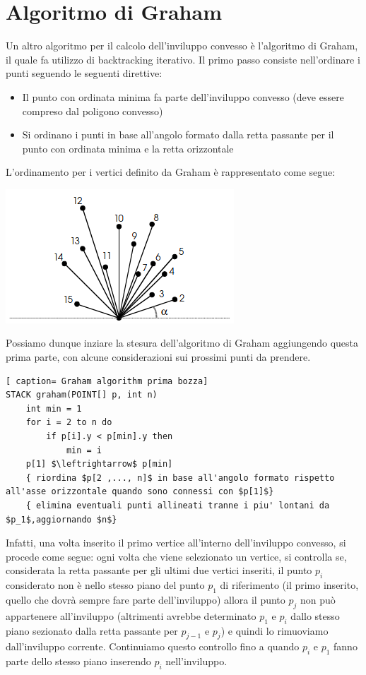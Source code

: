 \documentclass[../cheatSheetAlgoritmi.tex]{subfiles}
\begin{document}
\section{Algoritmo di Graham}
Un altro algoritmo per il calcolo dell'inviluppo convesso è l'algoritmo di Graham, il quale fa utilizzo di backtracking iterativo.
Il primo passo consiste nell'ordinare i punti seguendo le seguenti direttive:
\begin{itemize}
	\item Il punto con ordinata minima fa parte dell'inviluppo convesso (deve essere compreso dal poligono convesso)
	\item Si ordinano i punti in base all'angolo formato dalla retta passante per il punto con ordinata minima e la retta orizzontale
\end{itemize}
L'ordinamento per i vertici definito da Graham è rappresentato come segue:
\begin{center}
	\includegraphics{../img/backtracking_inviluppo_convesso_graham_1}
\end{center}
Possiamo dunque inziare la stesura dell'algoritmo di Graham aggiungendo questa prima parte, con alcune considerazioni sui prossimi punti da prendere. 
 \begin{lstlisting}[ caption= Graham algorithm prima bozza]
STACK graham(POINT[] p, int n)
	int min = 1
	for i = 2 to n do
		if p[i].y < p[min].y then 
			min = i
	p[1] $\leftrightarrow$ p[min]
	{ riordina $p[2 ,..., n]$ in base all'angolo formato rispetto all'asse orizzontale quando sono connessi con $p[1]$}
	{ elimina eventuali punti allineati tranne i piu' lontani da $p_1$,aggiornando $n$}
\end{lstlisting}
Infatti, una volta inserito il primo vertice all'interno dell'inviluppo convesso, si procede come segue: ogni volta che viene selezionato un vertice, si controlla se, considerata la retta passante per gli ultimi due vertici inseriti, il punto $p_i$ considerato non è nello stesso piano del punto $p_1$ di riferimento (il primo inserito, quello che dovrà sempre fare parte dell'inviluppo) allora il punto $p_j$ non può appartenere all'inviluppo (altrimenti avrebbe determinato $p_1$ e $p_i$ dallo stesso piano sezionato dalla retta passante per $p_{j-1}$ e $p_j$) e quindi lo rimuoviamo dall'inviluppo corrente. Continuiamo questo controllo fino a quando $p_i$ e $p_1$ fanno parte dello stesso piano inserendo $p_i$ nell'inviluppo. \\
\end{document}
